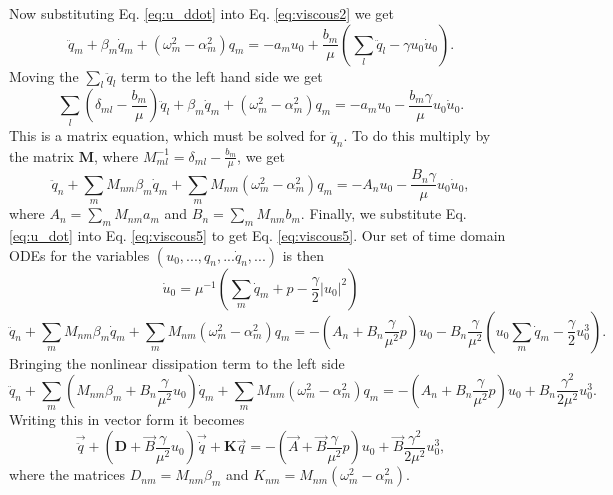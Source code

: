 \documentclass[superscriptaddress, onecolumn, prl]{revtex4}
\begin{document}
Now substituting Eq. \ref{eq:u_ddot} into Eq. \ref{eq:viscous2} we get 
\begin{equation}
\label{eq:viscous3}
\ddot{q}_m + \beta_m \dot{q}_m +(\omega_m^2 - \alpha_m^2) q_m = -a_m u_0 + \frac{b_m}{\mu}\left( \sum_l{\ddot{q}_l} - \gamma u_{0} \dot{u}_0  \right).
\end{equation} 
Moving the $\sum_l{\ddot{q}_l}$ term to the left hand side we get
\begin{equation}
\label{eq:viscous4}
\sum_l \left( \delta_{ml} -\frac{b_m}{\mu } \right)\ddot{q}_l + \beta_m \dot{q}_m +(\omega_m^2 - \alpha_m^2) q_m = -a_m u_0 - \frac{b_m \gamma}{\mu} u_{0} \dot{u}_0.
\end{equation} 
This is a matrix equation, which must be solved for $\ddot{q}_n$. To do this multiply by the matrix $\textbf{M}$, where $M_{ml}^{-1}=\delta_{ml} -\frac{b_m}{\mu}$, we get
\begin{equation}
\label{eq:viscous5}
\ddot{q}_n + \sum_m M_{nm} \beta_m \dot{q}_m + \sum_m M_{nm} (\omega_m^2 - \alpha_m^2) q_m = -A_n u_0 - \frac{B_n \gamma}{\mu} u_{0} \dot{u}_0,
\end{equation} 
where $A_n = \sum_m M_{nm} a_m$ and $B_n = \sum_m M_{nm} b_m$. Finally, we substitute Eq. \ref{eq:u_dot} into Eq. \ref{eq:viscous5} to get Eq. \ref{eq:viscous5}. Our set of time domain ODEs for the variables $(u_0,...,q_n,...\dot{q}_n,...)$ is then
\begin{equation}
\label{eq:u_dot}
\dot{u}_0 = \mu^{-1} \left(\sum_m{\dot{q}_m} + p -\frac{\gamma}{2} |u_{0}|^2  \right) 
\end{equation}
\begin{equation}
\label{eq:viscous6}
\ddot{q}_n + \sum_m M_{nm} \beta_m \dot{q}_m + \sum_m M_{nm} (\omega_m^2 - \alpha_m^2) q_m = -\left(A_n + B_n  \frac{\gamma }{\mu^2}p \right) u_0 - B_n  \frac{\gamma }{\mu^2} \left(u_0 \sum_m{\dot{q}_m} - \frac{\gamma}{2} u_{0}^3 \right).
\end{equation} 
Bringing the nonlinear dissipation term to the left side
\begin{equation}
\label{eq:viscous7}
\ddot{q}_n + \sum_m (M_{nm} \beta_m + B_n \frac{\gamma }{\mu^2} u_0) \dot{q}_m + \sum_m M_{nm} (\omega_m^2 - \alpha_m^2) q_m = -\left(A_n + B_n  \frac{\gamma }{\mu^2}p \right) u_0 + B_n  \frac{\gamma^2 }{2\mu^2} u_{0}^3.
\end{equation}
Writing this in vector form it becomes
\begin{equation}
\label{eq:viscous7}
\vec{\ddot{q}} + (\boldsymbol{D} + \vec{B} \frac{\gamma }{\mu^2} u_0) \vec{\dot{q}} + \boldsymbol{K} \vec{q} = -\left(\vec{A} + \vec{B}  \frac{\gamma }{\mu^2}p \right) u_0 + \vec{B}  \frac{\gamma^2 }{2\mu^2} u_{0}^3,
\end{equation}  
where the matrices $D_{nm}=M_{nm} \beta_m$ and $K_{nm}=M_{nm} (\omega_m^2 - \alpha_m^2)$.
\end{document}
